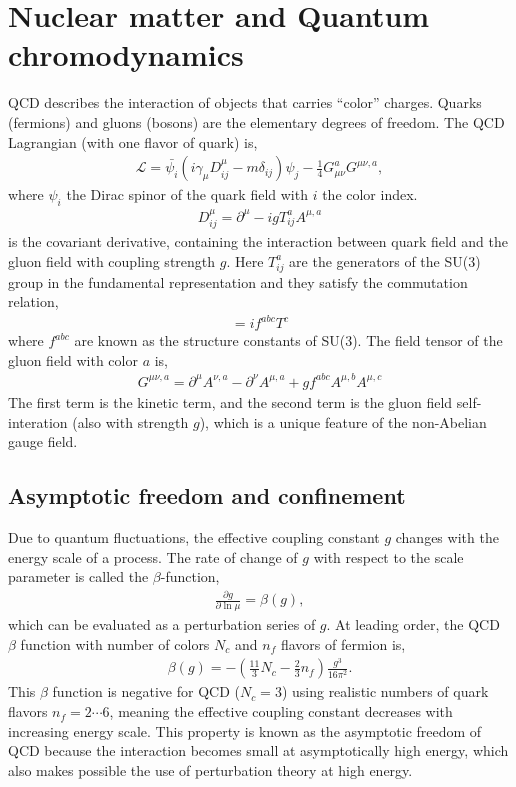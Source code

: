 \section{Nuclear matter and Quantum chromodynamics}
QCD describes the interaction of objects that carries ``color'' charges.
Quarks (fermions) and gluons (bosons) are the elementary degrees of freedom. 
The QCD Lagrangian (with one flavor of quark) is,
\begin{eqnarray}
\mathcal{L} = \bar{\psi_i} \left(i\gamma_\mu D^\mu_{ij} -m \delta_{ij} \right)\psi_j - \frac{1}{4}G_{\mu\nu}^a G^{\mu\nu,a},
\end{eqnarray}
where $\psi_i$ the Dirac spinor of the quark field with $i$ the color index.
\begin{eqnarray}
D_{ij}^\mu = \partial^\mu - i g T_{ij}^a A^{\mu, a}
\end{eqnarray}
is the covariant derivative, containing the interaction between quark field and the gluon field with coupling strength $g$.
Here $T_{ij}^a$ are the generators of the SU(3) group in the fundamental representation and they satisfy the commutation relation,
\begin{eqnarray}
[T^a, T^b] = i f^{abc} T^c
\end{eqnarray}
where $f^{abc}$ are known as the structure constants of SU(3).
The field tensor of the gluon field with color $a$ is,
\begin{eqnarray}
G^{\mu\nu,a} = \partial^\mu A^{\nu, a} - \partial^\nu A^{\mu, a} + g f^{abc} A^{\mu,b}A^{\mu,c}
\end{eqnarray}
The first term is the kinetic term, and the second term is the gluon field self-interation (also with strength $g$), which is a unique feature of the non-Abelian gauge field.

\subsection{Asymptotic freedom and confinement}
Due to quantum fluctuations, the effective coupling constant $g$ changes with the energy scale of a process. 
The rate of change of $g$ with respect to the scale parameter is called the $\beta$-function,
\begin{eqnarray}
\frac{\partial g}{\partial \ln\mu} = \beta(g),
\end{eqnarray}
which can be evaluated as a perturbation series of $g$.
At leading order, the QCD $\beta$ function with number of colors $N_c$ and $n_f$ flavors of fermion is,
\begin{eqnarray}
\beta(g) = - \left( \frac{11}{3}N_c - \frac{2}{3}n_f \right) \frac{g^3}{16\pi^2}.
\end{eqnarray}
This $\beta$ function is negative for QCD ($N_c=3$) using realistic numbers of quark flavors $n_f = 2\cdots 6$, meaning the effective coupling constant decreases with increasing energy scale.
This property is known as the asymptotic freedom of QCD because the interaction becomes small at asymptotically high energy, which also makes possible the use of perturbation theory at high energy.

